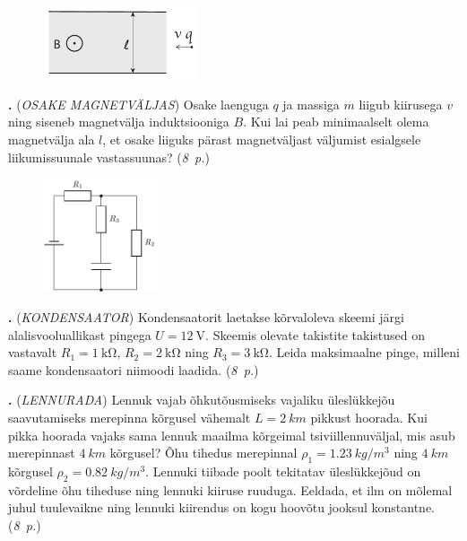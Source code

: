 \documentclass[12pt,a5paper]{article}
\newcommand{\numb}[1]{\vspace{5pt}\textbf{\large #1}}
\newcommand{\nimi}[1]{(\textsl{\small #1})}
\newcommand{\punktid}[1]{(\emph{#1~p.})}
\newcounter{ylesanne}
\newcommand{\yl}[1]{\addtocounter{ylesanne}{1}\numb{\theylesanne.} \nimi{#1} \newblock{}}
\begin{document}
\begin{figure}
	\vspace{-15pt}
	\begin{center}
		\includegraphics[width = 0.4\textwidth]{osakejoonis}
	\end{center}
\end{figure}


\yl{OSAKE MAGNETVÄLJAS}
Osake laenguga $q$ ja massiga $m$ liigub kiirusega $v$ ning siseneb  magnetvälja induktsiooniga $B$. Kui lai peab minimaalselt olema magnetvälja ala $l$, et osake liiguks pärast magnetväljast väljumist esialgsele liikumissuunale vastassuunas?
\punktid{8}




\begin{figure}
\vspace{-45pt}
	\begin{center}
		\includegraphics[width = 0.30\textwidth]{Joonis_kondensaator.pdf}
	\end{center}
\end{figure}


\yl{KONDENSAATOR} Kondensaatorit laetakse kõrvaloleva skeemi järgi alalisvooluallikast pingega $U=\SI{12}{\V}$. Skeemis olevate takistite takistused on vastavalt $R_1=\SI{1}{\kilo\ohm}$, $R_2=\SI{2}{\kilo\ohm}$ ning $R_3=\SI{3}{\kilo\ohm}$. Leida maksimaalne pinge, milleni saame kondensaatori niimoodi laadida. \punktid{8}

\vspace{10pt}
\yl{LENNURADA} Lennuk vajab õhkutõusmiseks vajaliku üleslükkejõu saavutamiseks merepinna kõrgusel vähemalt $L=\SI{2}{km}$ pikkust hoorada. Kui pikka hoorada vajaks sama lennuk maailma kõrgeimal tsiviillennuväljal, mis asub merepinnast $\SI{4}{km}$ kõrgusel? Õhu tihedus merepinnal $\rho_1 = \SI{1,23}{kg/m^3}$ ning $\SI{4}{km}$ kõrgusel $\rho_2 = \SI{0,82 }{kg/m^3}$. Lennuki tiibade poolt tekitatav üleslükkejõud on võrdeline õhu tiheduse ning lennuki kiiruse ruuduga. Eeldada, et ilm on mõlemal juhul tuulevaikne ning lennuki kiirendus on kogu hoovõtu jooksul konstantne. \punktid{8}
\end{document}
